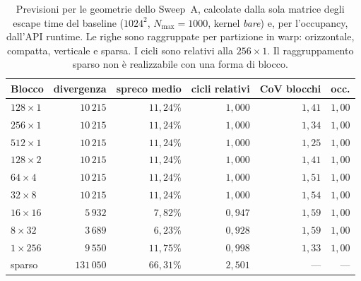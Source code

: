 \begin{table}[htbp]
    \centering
    \begin{tabular}{lrrrrr}
        \hline
        Blocco & divergenza & spreco medio & cicli relativi & CoV blocchi & occ. \\
        \hline
        $128{\times}1$ & $10\,215$ & $11{,}24\%$ & $1{,}000$ & $1{,}41$ & $1{,}00$ \\
        $256{\times}1$ & $10\,215$ & $11{,}24\%$ & $1{,}000$ & $1{,}34$ & $1{,}00$ \\
        $512{\times}1$ & $10\,215$ & $11{,}24\%$ & $1{,}000$ & $1{,}25$ & $1{,}00$ \\
        $128{\times}2$ & $10\,215$ & $11{,}24\%$ & $1{,}000$ & $1{,}41$ & $1{,}00$ \\
        $64{\times}4$  & $10\,215$ & $11{,}24\%$ & $1{,}000$ & $1{,}51$ & $1{,}00$ \\
        $32{\times}8$  & $10\,215$ & $11{,}24\%$ & $1{,}000$ & $1{,}54$ & $1{,}00$ \\
        \hline
        $16{\times}16$ & $5\,932$  & $7{,}82\%$  & $0{,}947$ & $1{,}59$ & $1{,}00$ \\
        $8{\times}32$  & $3\,689$  & $6{,}23\%$  & $0{,}928$ & $1{,}59$ & $1{,}00$ \\
        \hline
        $1{\times}256$ & $9\,550$  & $11{,}75\%$ & $0{,}998$ & $1{,}33$ & $1{,}00$ \\
        \hline
        sparso         & $131\,050$ & $66{,}31\%$ & $2{,}501$ & --- & --- \\
        \hline
    \end{tabular}
    \caption{Previsioni per le geometrie dello Sweep~A, calcolate dalla sola
    matrice degli escape time del baseline ($1024^2$, $N_{\max}=1000$, kernel
    \emph{bare}) e, per l'occupancy, dall'API runtime. Le righe sono raggruppate
    per partizione in warp: orizzontale, compatta, verticale e sparsa. I cicli
    sono relativi alla $256{\times}1$. Il raggruppamento sparso non è realizzabile
    con una forma di blocco.}
    \label{tab:cuda-previsioni}
\end{table}

